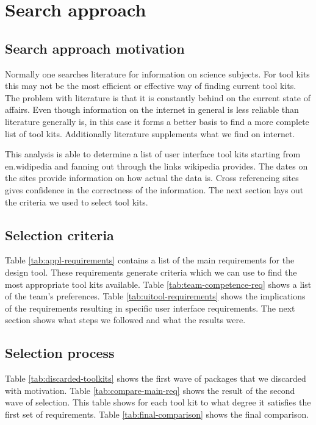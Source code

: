 \section{Search approach}

\subsection{Search approach motivation}

Normally one searches literature for information on science subjects. 
For tool kits this may not be the most efficient or effective way of finding 
current tool kits. The problem with literature is that it is constantly
behind on the current state of affairs. Even though information on the internet
in general is less reliable than literature generally is, in this case it forms
a better basis to find a more complete list of tool kits. Additionally literature
supplements what we find on internet.

This analysis is able to determine a list of user interface tool kits starting 
from en.widipedia and fanning out through the links wikipedia provides. The dates 
on the sites provide information on how actual the data is. Cross referencing 
sites gives confidence in the correctness of the information. The next section 
lays out the criteria we used to select tool kits.

\subsection{Selection criteria}

Table \ref{tab:appl-requirements} contains a list of the main requirements for
the design tool. These requirements generate criteria which we can use to find
the most appropriate tool kits available. Table \ref{tab:team-competence-req} 
shows a list of the team's preferences. Table \ref{tab:uitool-requirements} 
shows the implications of the requirements resulting in specific user interface 
requirements. The next section shows what steps we followed and what the results 
were.

\subsection{Selection process}

Table \ref{tab:discarded-toolkits} shows the first wave of packages that we discarded
with motivation. Table \ref{tab:compare-main-req} shows the result of 
the second wave of selection. This table shows for each tool kit to what degree it
satisfies the first set of requirements. Table \ref{tab:final-comparison} shows
the final comparison. 
